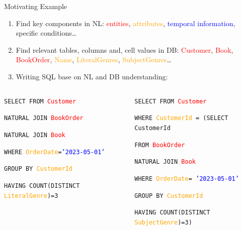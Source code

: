 \documentclass[aspectratio=169,xcolor=dvipsnames]{beamer}
\begin{document}
\begin{frame}{Motivating Example}
    \begin{enumerate}
        \item Find key components in NL: \textcolor{red}{entities}, \textcolor{orange}{attributes}, \textcolor{blue}{temporal information}, specific conditions\dots
        \item Find relevant tables, columns and, cell values in DB: \textcolor{red}{Customer}, \textcolor{red}{Book}, \textcolor{red}{BookOrder}, \textcolor{orange}{Name}, \textcolor{orange}{LiteralGenres}, \textcolor{orange}{SubjectGenres}\dots
        \item Writing SQL base on NL and DB understanding:
    \end{enumerate}
    \begin{columns}[T]
        \begin{column}{0.45\textwidth}
            \texttt{SELECT FROM \textcolor{red}{Customer}} 
            
            \texttt{NATURAL JOIN \textcolor{red}{BookOrder}}

            \texttt{NATURAL JOIN \textcolor{red}{Book}}
            
            \texttt{WHERE \textcolor{orange}{OrderDate}=\textcolor{blue}{'2023-05-01'}}
            
            \texttt{GROUP BY \textcolor{orange}{CustomerId}} 
            
            \texttt{HAVING COUNT(DISTINCT \textcolor{orange}{LiteralGenre})=3}
        \end{column}

        \begin{column}{0.45\textwidth}
            \texttt{SELECT FROM \textcolor{red}{Customer}}

            \texttt{WHERE \textcolor{orange}{CustomerId} = (SELECT CustomerId}
            
            \texttt{FROM \textcolor{red}{BookOrder}} 
            
            \texttt{NATURAL JOIN \textcolor{red}{Book}}  
            
            \texttt{WHERE \textcolor{orange}{OrderDate}= \textcolor{blue}{'2023-05-01'}}
            
            \texttt{GROUP BY \textcolor{orange}{CustomerId}}  
            
            \texttt{HAVING COUNT(DISTINCT \textcolor{orange}{SubjectGenre})=3)}
        \end{column}
    \end{columns}
\end{frame}
\end{document}
